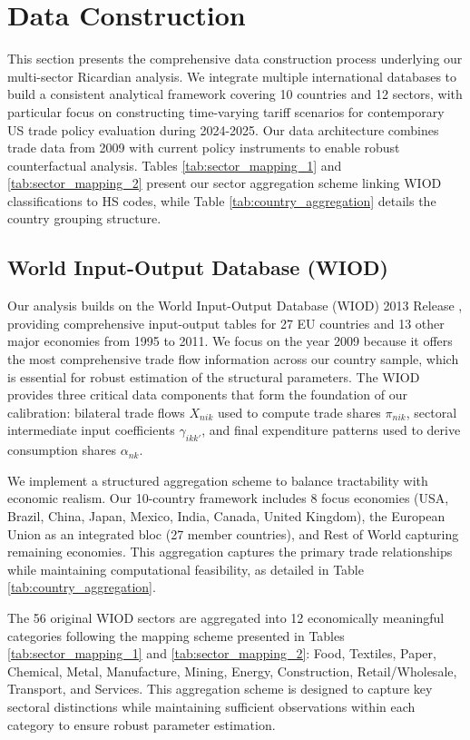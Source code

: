 \section{Data Construction}

This section presents the comprehensive data construction process underlying our multi-sector Ricardian analysis. We integrate multiple international databases to build a consistent analytical framework covering 10 countries and 12 sectors, with particular focus on constructing time-varying tariff scenarios for contemporary US trade policy evaluation during 2024-2025. Our data architecture combines trade data from 2009 with current policy instruments to enable robust counterfactual analysis. Tables \ref{tab:sector_mapping_1} and \ref{tab:sector_mapping_2} present our sector aggregation scheme linking WIOD classifications to HS codes, while Table \ref{tab:country_aggregation} details the country grouping structure.

\subsection{World Input-Output Database (WIOD)}

Our analysis builds on the World Input-Output Database (WIOD) 2013 Release \citep{timmer2015illustrated}, providing comprehensive input-output tables for 27 EU countries and 13 other major economies from 1995 to 2011. We focus on the year 2009 because it offers the most comprehensive trade flow information across our country sample, which is essential for robust estimation of the structural parameters. The WIOD provides three critical data components that form the foundation of our calibration: bilateral trade flows $X_{nik}$ used to compute trade shares $\pi_{nik}$, sectoral intermediate input coefficients $\gamma_{ikk'}$, and final expenditure patterns used to derive consumption shares $\alpha_{nk}$.

We implement a structured aggregation scheme to balance tractability with economic realism. Our 10-country framework includes 8 focus economies (USA, Brazil, China, Japan, Mexico, India, Canada, United Kingdom), the European Union as an integrated bloc (27 member countries), and Rest of World capturing remaining economies. This aggregation captures the primary trade relationships while maintaining computational feasibility, as detailed in Table \ref{tab:country_aggregation}. 



The 56 original WIOD sectors are aggregated into 12 economically meaningful categories following the mapping scheme presented in Tables \ref{tab:sector_mapping_1} and \ref{tab:sector_mapping_2}: Food, Textiles, Paper, Chemical, Metal, Manufacture, Mining, Energy, Construction, Retail/Wholesale, Transport, and Services. This aggregation scheme is designed to capture key sectoral distinctions while maintaining sufficient observations within each category to ensure robust parameter estimation.

